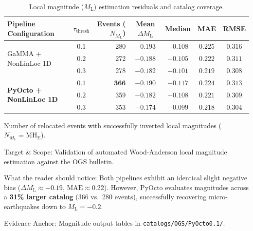 \begin{table}[htbp]
  \centering
  \small
  \caption{Local magnitude ($M_{\mathrm{L}}$) estimation residuals and catalog coverage.}
  \label{tab:magnitude_benchmark}
  \begin{threeparttable}
    \begin{tabularx}{\linewidth}{l c r c c c c}
      \toprule
      \textbf{Pipeline Configuration} & $\tau_{\mathrm{thresh}}$ & \textbf{Events ($N_{M_{\mathrm{L}}}$)}\tnote{a} & \textbf{Mean $\Delta M_{\mathrm{L}}$} & \textbf{Median} & \textbf{MAE} & \textbf{RMSE} \\
      \midrule
      \multirow{3}{*}{GaMMA + NonLinLoc 1D} & $0.1$ & \num{280} & $-0.193$ & $-0.108$ & $0.225$ & $0.316$ \\
      & $0.2$ & \num{272} & $-0.188$ & $-0.105$ & $0.222$ & $0.311$ \\
      & $0.3$ & \num{278} & $-0.182$ & $-0.101$ & $0.219$ & $0.308$ \\
      \midrule
      \multirow{3}{*}{\textbf{PyOcto + NonLinLoc 1D}} & $0.1$ & $\mathbf{366}$ & $-0.190$ & $-0.117$ & $0.224$ & $0.313$ \\
      & $0.2$ & \num{359} & $-0.182$ & $-0.108$ & $0.221$ & $0.309$ \\
      & $0.3$ & \num{353} & $\mathbf{-0.174}$ & $\mathbf{-0.099}$ & $\mathbf{0.218}$ & $\mathbf{0.304}$ \\
      \bottomrule
    \end{tabularx}
    \begin{tablenotes}[flushleft]
      \footnotesize
      \item[a] Number of relocated events with successfully inverted local magnitudes ($N_{M_{\mathrm{L}}} = \mathrm{MH}_{\mathrm{E}}$).
      \item Target \& Scope: Validation of automated Wood-Anderson local magnitude estimation against the OGS bulletin.
      \item What the reader should notice: Both pipelines exhibit an identical slight negative bias ($\Delta M_{\mathrm{L}} \approx -0.19$, $\mathrm{MAE} \approx 0.22$). However, PyOcto evaluates magnitudes across a \textbf{31\% larger catalog} (366 vs.\ 280 events), successfully recovering micro-earthquakes down to $M_{\mathrm{L}} = -0.2$.
      \item Evidence Anchor: Magnitude output tables in \texttt{catalogs/OGS/PyOcto0.1/}.
    \end{tablenotes}
  \end{threeparttable}
\end{table}

